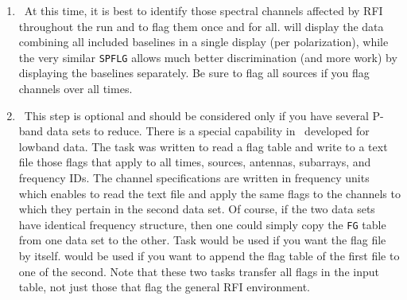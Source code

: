 \begin{enumerate}
\item\ At this time, it is best to identify those spectral channels
  affected by RFI throughout the run and to flag them once and for
  all.  {\tt {}} will display the data combining all
  included baselines in a single display (per polarization), while the
  very similar {\tt SPFLG} allows much better discrimination (and more
  work) by displaying the baselines separately.  Be sure to flag all
  sources if you flag channels over all times.

\item\ This step is optional and should be considered only if you have
  several P-band data sets to reduce.  There is a special capability
  in \AIPS\ developed for lowband data.  The task {\tt {}}
  was written to read a flag table and write to a text file those
  flags that apply to all times, sources, antennas, subarrays, and
  frequency IDs.  The channel specifications are written in frequency
  units which enables {\tt {}} to read the text file and
  apply the same flags to the channels to which they pertain in the
  second data set.  Of course, if the two data sets have identical
  frequency structure, then one could simply copy the {\tt FG} table
  from one data set to the other.  Task {\tt {}} would be
  used if you want the flag file by itself.  {\tt {}} would
  be used if you want to append the flag table of the first file to
  one of the second.  Note that these two tasks transfer all flags in
  the input table, not just those that flag the general RFI
  environment.


\end{enumerate}
